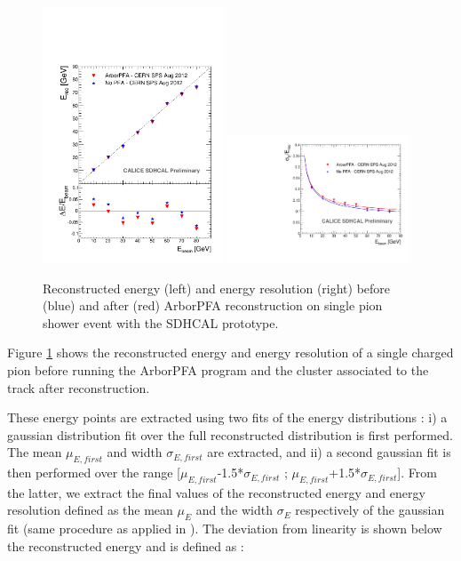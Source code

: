 \documentclass[12pt]{article}
\begin{document}
\begin{figure}[!h]
  \begin{center}
    \includegraphics[width=0.48\textwidth]{plots/SingleParticle_ERec.pdf}
    \includegraphics[width=0.48\textwidth]{plots/SingleParticle_EResol.pdf} \\
  \end{center}
  \caption{\label{ARBOR_SINGLE_PARTICLE_EREC_AND_ERESOL} Reconstructed energy (left) and energy resolution (right) before (blue) and after (red) ArborPFA reconstruction on single pion shower event with the SDHCAL prototype.}
\end{figure}

Figure \ref{ARBOR_SINGLE_PARTICLE_EREC_AND_ERESOL} shows the reconstructed energy and energy resolution of a single charged pion before running the ArborPFA program and the cluster associated to the track after reconstruction.

These energy points are extracted using two fits of the energy distributions : i) a gaussian distribution fit over the full reconstructed distribution is first performed. The mean $\mu_{E,first}$ and width $\sigma_{E,first}$ are extracted, and ii) a second gaussian fit is then performed over the range [$\mu_{E,first}$-1.5*$\sigma_{E,first}$ ; $\mu_{E,first}$+1.5*$\sigma_{E,first}$]. From the latter, we extract the final values of the reconstructed energy and energy resolution defined as the mean $\mu_E$ and the width $\sigma_E$ respectively of the gaussian fit (same procedure as applied in \cite{sdhcal-paper}). 
The deviation from linearity is shown below the reconstructed energy and is defined as :
\end{document}
